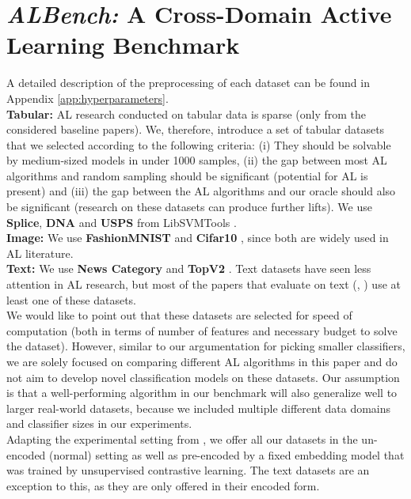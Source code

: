 \documentclass[]{article}
\begin{document}
\section{\emph{ALBench:} A Cross-Domain Active Learning Benchmark}\label{sec:datasets}
A detailed description of the preprocessing of each dataset can be found in Appendix \ref{app:hyperparameters}. \\ [1mm]
\textbf{Tabular:}
AL research conducted on tabular data is sparse (only \cite{ashdeep} from the considered baseline papers). 
We, therefore, introduce a set of tabular datasets that we selected according to the following criteria:
(i) They should be solvable by medium-sized models in under 1000 samples, (ii) the gap between most AL algorithms and random sampling should be significant (potential for AL is present) and (iii) the gap between the AL algorithms and our oracle should also be significant (research on these datasets can produce further lifts).
We use \textbf{Splice}, \textbf{DNA} and \textbf{USPS} from LibSVMTools \cite{libsvmtools}.\\
\textbf{Image:}
We use \textbf{FashionMNIST} \cite{xiao2017fashion} and \textbf{Cifar10} \cite{krizhevsky2009learning}, since both are widely used in AL literature.\\
\textbf{Text:}
We use \textbf{News Category} \cite{misra2022news} and \textbf{TopV2} \cite{chen-etal-2020-low-resource}.
Text datasets have seen less attention in AL research, but most of the papers that evaluate on text (\cite{hu2021towards}, \cite{zhou2021towards}) use at least one of these datasets.\\ [1mm]
%
We would like to point out that these datasets are selected for speed of computation (both in terms of number of features and necessary budget to solve the dataset). 
However, similar to our argumentation for picking smaller classifiers, we are solely focused on comparing different AL algorithms in this paper and do not aim to develop novel classification models on these datasets.
Our assumption is that a well-performing algorithm in our benchmark will also generalize well to larger real-world datasets, because we included multiple different data domains and classifier sizes in our experiments. \\ [1mm]
Adapting the experimental setting from \cite{hacohen2022active}, we offer all our datasets in the un-encoded (normal) setting as well as pre-encoded by a fixed embedding model that was trained by unsupervised contrastive learning. 
The text datasets are an exception to this, as they are only offered in their encoded form.
\end{document}
